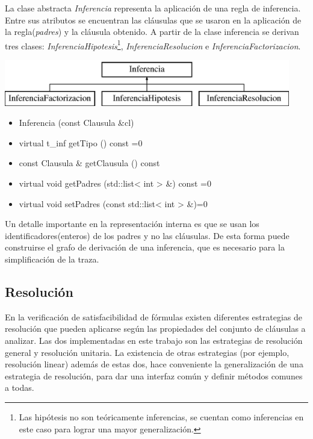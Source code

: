 \documentclass[a4paper,12pt]{article}
\begin{document}
La clase abstracta \emph{Inferencia} representa la aplicación de una regla de inferencia. Entre sus atributos se encuentran
las cláusulas que se usaron en la aplicación de la regla(\emph{padres}) y la cláusula obtenido. A partir de
la clase inferencia se derivan tres clases: \emph{InferenciaHipotesis}\footnote{Las hipótesis no son teóricamente
inferencias, se cuentan como inferencias en este caso para lograr una mayor generalización.}, \emph{InferenciaResolucion} e
\emph{InferenciaFactorizacion}.
\begin{center}
\leavevmode
\includegraphics[height=2cm]{imagenes/classInferencia}
\end{center}
\begin{itemize}
\renewcommand{\labelitemi}{$\bullet$}
\item Inferencia (const Clausula \&cl)
\item virtual t\_inf getTipo () const =0
\item const Clausula \& getClausula () const
\item virtual void getPadres (std::list< int > \&) const =0
\item virtual void setPadres (const std::list< int > \&)=0
\end{itemize}
Un detalle importante en la representación interna es que se usan los identificadores(enteros) de los padres
y no las cláusulas. De esta forma puede construirse el grafo de derivación de una inferencia, que es
necesario para la simplificación de la traza.
\subsection{Resolución}
En la verificación de satisfacibilidad de fórmulas existen diferentes estrategias de resolución que pueden
aplicarse según las propiedades del conjunto de cláusulas a analizar. Las dos implementadas en este
trabajo son las estrategias de resolución general y resolución unitaria. La existencia de otras estrategias
(por ejemplo, resolución linear) además de estas dos, hace conveniente la generalización de una estrategia de
resolución, para dar una interfaz común y definir métodos comunes a todas.
\end{document}
